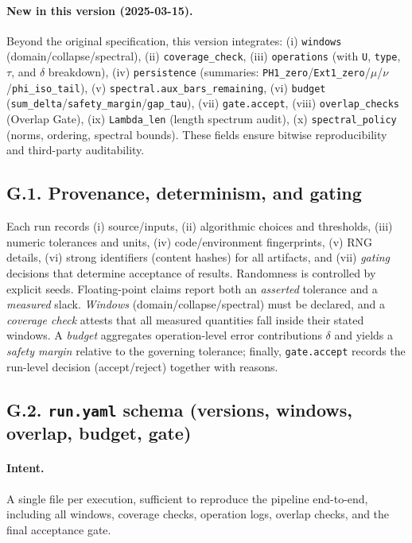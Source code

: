 \documentclass[11pt]{article}
\numberwithin{equation}{section}
\theoremstyle{plain}
\theoremstyle{definition}
\theoremstyle{remark}
\theoremstyle{plain}
\theoremstyle{definition}
\numberwithin{equation}{section}
\theoremstyle{definition}
\numberwithin{equation}{section}
\theoremstyle{plain}
\theoremstyle{definition}
\theoremstyle{remark}
\begin{document}
\paragraph{New in this version (2025-03-15).}
Beyond the original specification, this version integrates:
(i) \texttt{windows} (domain/collapse/spectral),
(ii) \texttt{coverage\_check},
(iii) \texttt{operations} (with \texttt{U}, \texttt{type}, \(\tau\), and \(\delta\) breakdown),
(iv) \texttt{persistence} (summaries: \texttt{PH1\_zero}/\texttt{Ext1\_zero}/\(\mu\)/\(\nu\)/\texttt{phi\_iso\_tail}),
(v) \texttt{spectral.aux\_bars\_remaining},
(vi) \texttt{budget} (\texttt{sum\_delta}/\texttt{safety\_margin}/\texttt{gap\_tau}),
(vii) \texttt{gate.accept},
(viii) \texttt{overlap\_checks} (Overlap Gate),
(ix) \texttt{Lambda\_len} (length spectrum audit),
(x) \texttt{spectral\_policy} (norms, ordering, spectral bounds).
These fields ensure bitwise reproducibility and third-party auditability.

\subsection*{G.1. Provenance, determinism, and gating}
Each run records (i) source/inputs, (ii) algorithmic choices and thresholds, (iii) numeric
tolerances and units, (iv) code/environment fingerprints, (v) RNG details, (vi) strong identifiers
(content hashes) for all artifacts, and (vii) \emph{gating} decisions that determine acceptance of results.
Randomness is controlled by explicit seeds. Floating-point claims report both an \emph{asserted} tolerance
and a \emph{measured} slack. \emph{Windows} (domain/collapse/spectral) must be declared, and a
\emph{coverage check} attests that all measured quantities fall inside their stated windows.
A \emph{budget} aggregates operation-level error contributions \(\delta\) and yields a
\emph{safety margin} relative to the governing tolerance; finally, \texttt{gate.accept} records the run-level
decision (accept/reject) together with reasons.

\subsection*{G.2. \texttt{run.yaml} schema (versions, windows, overlap, budget, gate)}
\paragraph{Intent.} A single file per execution, sufficient to reproduce the pipeline end-to-end, including
all windows, coverage checks, operation logs, overlap checks, and the final acceptance gate.
\end{document}
